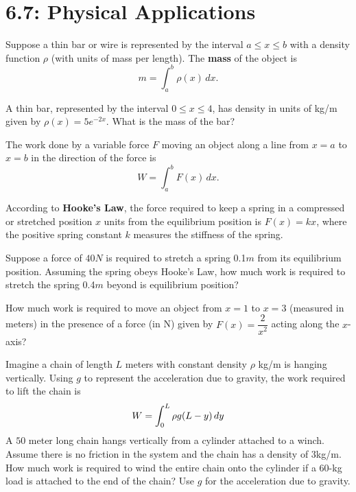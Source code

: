 \documentclass[../mathNotesPreamble]{subfiles}
\begin{document}
  \section{6.7: Physical Applications}

  \begin{defn*}
    Suppose a thin bar or wire is represented by the interval $a\leq x\leq b$ with a density function $\rho$ (with units of mass per length). The \textbf{mass} of the object is
      \[m=\int_a^b \rho(x)\,dx.\]
  \end{defn*}

  \begin{ex*}
    A thin bar, represented by the interval $0\leq x\leq 4$, has density in units of kg/m given by $\rho(x)=5e^{-2x}$. What is the mass of the bar?
  \end{ex*}
  \pagebreak

  \begin{defn*}[Work]
    The work done by a variable force $F$ moving an object along a line from $x=a$ to $x=b$ in the direction of the force is
      \[W=\int_a^b F(x)\,dx.\]
  \end{defn*}

  \begin{ex*}
    According to \textbf{Hooke's Law}, the force required to keep a spring in a compressed or stretched position $x$ units from the equilibrium position is $F(x)=kx$, where the positive spring constant $k$ measures the stiffness of the spring.
    \vspace*{\baselineskip}

    Suppose a force of $40 N$ is required to stretch a spring 0.1$m$ from its equilibrium position. Assuming the spring obeys Hooke's Law, how much work is required to stretch the spring 0.4$m$ beyond is equilibrium position? 
  \end{ex*}

  \begin{ex*}
    How much work is required to move an object from $x=1$ to $x=3$ (measured in meters) in the presence of a force (in N) given by $F(x)=\dfrac{2}{x^2}$ acting along the $x$-axis?
  \end{ex*}
  \pagebreak

  \begin{ex*}
    Imagine a chain of length $L$ meters with constant density $\rho$ kg/m is hanging vertically. Using $g$ to represent the acceleration due to gravity, the work required to lift the chain is
      \[W=\int_0^L \rho g{\left(L-y\right)}\,dy\]
    A $50$ meter long chain hangs vertically from a cylinder attached to a winch. Assume there is no friction in the system and the chain has a density of $3$\nobreakspace kg/m. How much work is required to wind the entire chain onto the cylinder if a $60$-kg load is attached to the end of the chain? Use $g$ for the acceleration due to gravity.
  \end{ex*}
  \pagebreak
\end{document}
